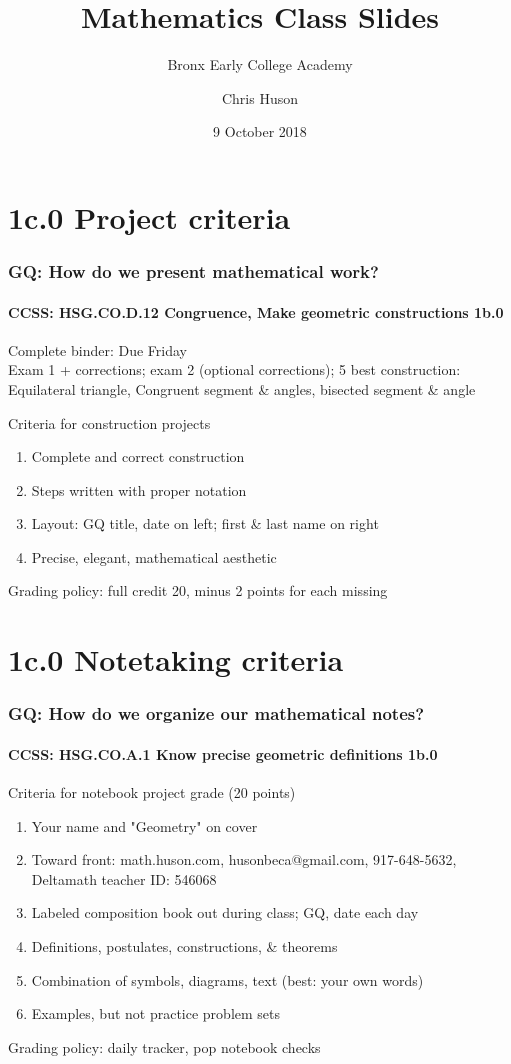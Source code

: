 \documentclass{beamer}
\title{Mathematics Class Slides}
\subtitle{Bronx Early College Academy}
\author{Chris Huson}
\date{9 October 2018}
\begin{document}
\frame{\titlepage}
\section[Outline]{}
\frame{\tableofcontents}

\section{1c.0 Project criteria}
  \frame
  {
    \frametitle{GQ: How do we present mathematical work?}
    \framesubtitle{CCSS: HSG.CO.D.12 Congruence, Make geometric constructions  \alert{1b.0}}

    Complete binder: \alert{Due Friday}\\
    Exam 1 + corrections; exam 2 (optional corrections); 5 best construction:\\
    Equilateral triangle, Congruent segment \& angles, bisected segment \& angle
      \begin{block}{Criteria for construction projects}
      \begin{enumerate}
          \item Complete and correct construction
          \item Steps written with proper notation
          \item Layout: GQ title, date on left; first \& last name on right
          \item Precise, elegant, mathematical aesthetic
      \end{enumerate}
      \end{block}
    Grading policy: full credit 20, minus 2 points for each missing\\[5pt]
  }

\section{1c.0 Notetaking criteria}
  \frame
  {
    \frametitle{GQ: How do we organize our mathematical notes?}
    \framesubtitle{CCSS: HSG.CO.A.1 Know precise geometric definitions  \alert{1b.0}}

    \begin{block}{Criteria for notebook project grade (20 points)}
    \begin{enumerate}
      \item \alert{Your name and "Geometry" on cover}
      \item \alert{Toward front: math.huson.com, husonbeca@gmail.com, 917-648-5632, Deltamath teacher ID: 546068}
      \item Labeled composition book out during class; GQ, date each day
      \item Definitions, postulates, constructions, \& theorems
      \item Combination of symbols, diagrams, text (best: your own words)
      \item Examples, but not practice problem sets
    \end{enumerate}
    \end{block}
    Grading policy: daily tracker, pop notebook checks
  }
\end{document}
